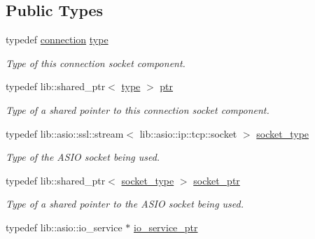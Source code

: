 \subsection*{Public Types}
\begin{DoxyCompactItemize}
\item 
typedef \hyperlink{classwebsocketpp_1_1transport_1_1asio_1_1tls__socket_1_1connection}{connection} \hyperlink{classwebsocketpp_1_1transport_1_1asio_1_1tls__socket_1_1connection_a13b5aceec8084df22fbce516365e1dc8}{type}
\begin{DoxyCompactList}\small\item\em Type of this connection socket component. \end{DoxyCompactList}\item 
typedef lib\+::shared\+\_\+ptr$<$ \hyperlink{classwebsocketpp_1_1transport_1_1asio_1_1tls__socket_1_1connection_a13b5aceec8084df22fbce516365e1dc8}{type} $>$ \hyperlink{classwebsocketpp_1_1transport_1_1asio_1_1tls__socket_1_1connection_a2aa605c27a476eba644e062dc5bc4f6d}{ptr}
\begin{DoxyCompactList}\small\item\em Type of a shared pointer to this connection socket component. \end{DoxyCompactList}\item 
typedef lib\+::asio\+::ssl\+::stream$<$ lib\+::asio\+::ip\+::tcp\+::socket $>$ \hyperlink{classwebsocketpp_1_1transport_1_1asio_1_1tls__socket_1_1connection_a99c358b4afc58ee1b1b60cf32fcf5c87}{socket\+\_\+type}
\begin{DoxyCompactList}\small\item\em Type of the A\+S\+I\+O socket being used. \end{DoxyCompactList}\item 
typedef lib\+::shared\+\_\+ptr$<$ \hyperlink{classwebsocketpp_1_1transport_1_1asio_1_1tls__socket_1_1connection_a99c358b4afc58ee1b1b60cf32fcf5c87}{socket\+\_\+type} $>$ \hyperlink{classwebsocketpp_1_1transport_1_1asio_1_1tls__socket_1_1connection_a340a92078a69e44d79996c7d2f9f7aa2}{socket\+\_\+ptr}
\begin{DoxyCompactList}\small\item\em Type of a shared pointer to the A\+S\+I\+O socket being used. \end{DoxyCompactList}\item 
typedef lib\+::asio\+::io\+\_\+service $\ast$ \hyperlink{classwebsocketpp_1_1transport_1_1asio_1_1tls__socket_1_1connection_af821cbbeb6df7cdea6348c7d64b00b7a}{io\+\_\+service\+\_\+ptr}

\end{DoxyCompactItemize}
